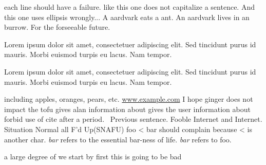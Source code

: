 each line should have a failure.  like this one does not capitalize a sentence.
And this one uses ellipsis wrongly...
A aardvark eats a ant.
An aardvark lives in an burrow.
For the forseeable future.
\caption{Lorem ipsum dolor sit amet, consectetuer adipiscing elit. Sed tincidunt purus id mauris. Morbi euismod turpis eu lacus. Nam tempor.}
\caption{\label{thelabel}Lorem ipsum dolor sit amet, consectetuer adipiscing elit. Sed tincidunt purus id mauris. Morbi euismod turpis eu lacus. Nam tempor.}
including apples, oranges, pears, etc.
\url{www.example.com}
I hope ginger does not impact the tofu
gives alan information about
gives the user information about
forbid use of cite after a period.~\cite{foo}
Previous sentence.  Fooble Internet and Internet.
Situation Normal all F'd Up(SNAFU)
foo < bar should complain because < is another char.
\emph{bar} refers to the essential bar-ness of life.
\emph{bar} refers to foo.

a large degree of 
we start by first
this is going to be bad
